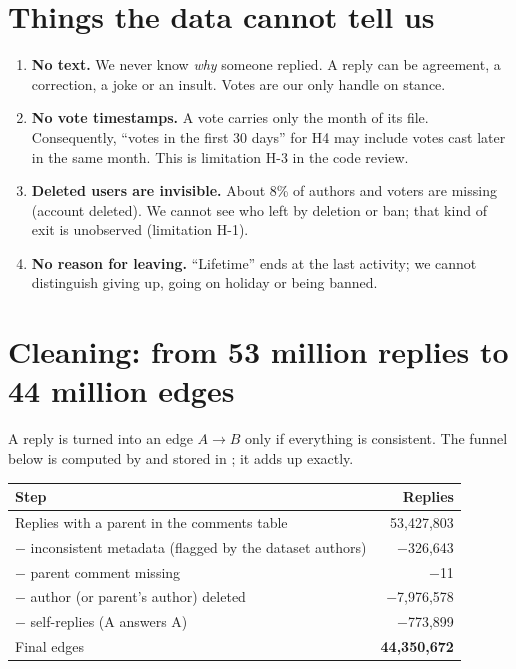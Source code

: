 \section{Things the data cannot tell us}
\begin{enumerate}
  \item \textbf{No text.} We never know \emph{why} someone replied. A reply can be agreement, a correction, a joke or an insult. Votes are our only handle on stance.
  \item \textbf{No vote timestamps.} A vote carries only the month of its file. Consequently, ``votes in the first 30 days'' for H4 may include votes cast later in the same month. This is limitation H-3 in the code review.
  \item \textbf{Deleted users are invisible.} About 8\% of authors and voters are missing (account deleted). We cannot see who left by deletion or ban; that kind of exit is unobserved (limitation H-1).
  \item \textbf{No reason for leaving.} ``Lifetime'' ends at the last activity; we cannot distinguish giving up, going on holiday or being banned.
\end{enumerate}

\section{Cleaning: from 53 million replies to 44 million edges}
A reply is turned into an edge $A\to B$ only if everything is consistent. The funnel below is computed by  and stored in ; it adds up exactly.

\begin{center}
\begin{tabular}{@{}l r@{}}
\toprule
Step & Replies \\
\midrule
Replies with a parent in the comments table & 53,427,803 \\
\quad $-$ inconsistent metadata (flagged by the dataset authors) & $-$326,643 \\
\quad $-$ parent comment missing & $-$11 \\
\quad $-$ author (or parent's author) deleted & $-$7,976,578 \\
\quad $-$ self-replies (A answers A) & $-$773,899 \\
\midrule
Final edges & \textbf{44,350,672} \\
\bottomrule
\end{tabular}
\end{center}

